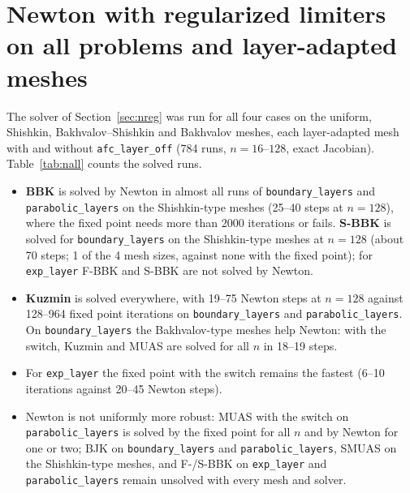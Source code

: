 \documentclass[11pt]{article}
\begin{document}
\section{Newton with regularized limiters on all problems and layer-adapted meshes}\label{sec:nall}

The solver of Section~\ref{sec:nreg} was run for all four cases on the uniform, Shishkin, Bakhvalov--Shishkin and
Bakhvalov meshes, each layer-adapted mesh with and without \texttt{afc\_layer\_off} (784 runs, $n=16$--$128$, exact
Jacobian). Table~\ref{tab:nall} counts the solved runs.



\begin{itemize}[leftmargin=*]
\item \textbf{BBK} is solved by Newton in almost all runs of \texttt{boundary\_layers} and \texttt{parabolic\_layers}
  on the Shishkin-type meshes (25--40 steps at $n=128$), where the fixed point needs more than 2000 iterations or
  fails. \textbf{S-BBK} is solved for \texttt{boundary\_layers} on the Shishkin-type meshes at $n=128$ (about 70
  steps; 1 of the 4 mesh sizes, against none with the fixed point); for \texttt{exp\_layer} F-BBK and S-BBK are not solved by Newton.
\item \textbf{Kuzmin} is solved everywhere, with 19--75 Newton steps at $n=128$ against 128--964 fixed point
  iterations on \texttt{boundary\_layers} and \texttt{parabolic\_layers}. On \texttt{boundary\_layers} the
  Bakhvalov-type meshes help Newton: with the switch, Kuzmin and MUAS are solved for all $n$ in 18--19 steps.
\item For \texttt{exp\_layer} the fixed point with the switch remains the fastest (6--10 iterations against 20--45
  Newton steps).
\item Newton is not uniformly more robust: MUAS with the switch on \texttt{parabolic\_layers} is solved by the fixed
  point for all $n$ and by Newton for one or two; BJK on \texttt{boundary\_layers} and \texttt{parabolic\_layers},
  SMUAS on the Shishkin-type meshes, and F-/S-BBK on \texttt{exp\_layer} and \texttt{parabolic\_layers} remain
  unsolved with every mesh and solver.
\end{itemize}

\end{document}
